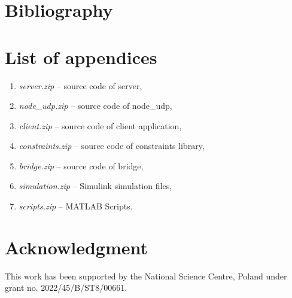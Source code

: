 \chapter{Bibliography}
\printbibliography[heading=none]





\chapter*{List of appendices}

\begin{enumerate}
	\item \textit{server.zip} -- source code of server,
	\item \textit{node\_udp.zip} -- source code of node\_udp,
	\item \textit{client.zip} -- source code of client application,
	\item \textit{constraints.zip} -- source code of constraints library,
	\item \textit{bridge.zip} -- source code of bridge,
	\item \textit{simulation.zip} -- Simulink simulation files,
	\item \textit{scripts.zip} -- MATLAB Scripts.
\end{enumerate}
\thispagestyle{empty}

\chapter*{Acknowledgment}

This work has been supported by the National Science Centre, Poland under grant no. 2022/45/B/ST8/00661.